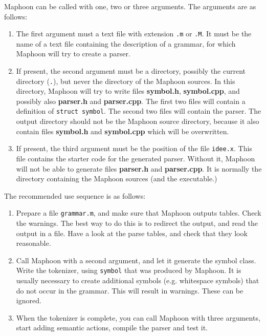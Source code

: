 \documentclass{article}
\begin{document}
Maphoon can be called with one, two or three arguments.
The arguments are as follows:
\begin{enumerate}
\item
   The first argument must a text file with extension \verb+.m+
   or \verb+.M+. 
   It must be the name of a text file containing the description of
   a grammar, for which Maphoon will try to create a parser. 
\item
   If present, the second argument 
   must be a directory, possibly the current
   directory (\verb+.+), but never the directory of the Maphoon sources. 
   In this directory, 
   Maphoon will try to write files {\bf symbol.h}, 
   {\bf symbol.cpp}, and possibly also
   {\bf parser.h} and {\bf parser.cpp}. 
   The first two files will contain a definition of \verb+struct symbol+.
   The second two files will contain the parser. 
   The output directory should not be the Maphoon source directory,
   because it  also contain 
   files {\bf symbol.h} and {\bf symbol.cpp}
   which will be overwritten. 
\item
   If present, the third argument must be 
   the position of the file \verb+idee.x+.
   This file contains the starter code for the generated parser.
   Without it, Maphoon will not be able to
   generate files {\bf parser.h} and
   {\bf parser.cpp}. 
   It is normally the directory containing the Maphoon sources
   (and the executable.) 
\end{enumerate}

\noindent
The recommended use sequence is as follows:
\begin{enumerate}
\item
   Prepare a file \verb+grammar.m+, and make sure that
   Maphoon outputs tables. Check the warnings.
   The best way to do this is to redirect the output, and
   read the output in a file.  
   Have a look at the parse tables, and check
   that they look reasonable. 
\item
   Call Maphoon with a second argument, 
   and let it generate the 
   symbol class. 
   Write the tokenizer, using \verb+symbol+ that was
   produced by Maphoon. 
   It is usually necessary to create additional symbols
   (e.g. whitespace symbols) that do not occur in the grammar.
   This will result in warnings. These can be ignored. 
\item
   When the tokenizer is complete, you can call Maphoon with
   three arguments, start adding semantic actions, 
   compile the parser and test it. 
\end{enumerate}
\end{document}
